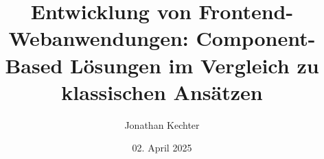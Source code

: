 \documentclass[oneside]{ausarbeitung}
\begin{document}


\Bachelorarbeit

\Informatik
\title{Entwicklung von Frontend-Webanwendungen: Component-Based Lösungen im Vergleich zu klassischen Ansätzen}

\author{Jonathan Kechter}

\examinerIsAProfessortrue   %


\date{02. April 2025}





\maketitle
\cleardoublepage

\setcounter{page}{1}

\cleardoublepage

\makeaffirmation
\cleardoublepage

\cleardoublepage
\end{document}
